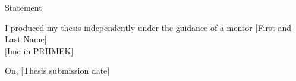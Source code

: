 \newpage\thispagestyle{empty}
%
\vspace*{3cm}
\begin{center}
\large{Statement}
\end{center}
%
\begin{flushleft}
\bigskip \bigskip
I produced my thesis independently under the guidance of a mentor
$[$First and Last Name$]$\\
%
\bigskip \bigskip \bigskip \hspace{12cm} $[$Ime in PRIIMEK$]$\\
\end{flushleft}
%
\bigskip \bigskip \bigskip \bigskip
On, $[$Thesis submission date$]$
